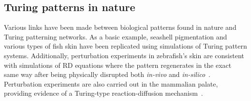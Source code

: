 
\subsection{Turing patterns in nature}\label{Turing patterns in nature}
Various links have been made between biological patterns found in nature and Turing patterning networks.
As a basic example, seashell pigmentation and various types of fish skin have been replicated using simulations of Turing pattern systems.
Additionally, perturbation experiments in zebrafish’s skin are consistent with simulations of RD equations where the pattern regenerates in the exact same way after being physically disrupted both \textit{in-vivo} and \textit{in-silico}~\parencite{Kondo2010a}.
Perturbation experiments are also carried out in the mammalian palate, providing evidence of a Turing-type reaction-diffusion mechanism~\parencite{Economou2012}.

